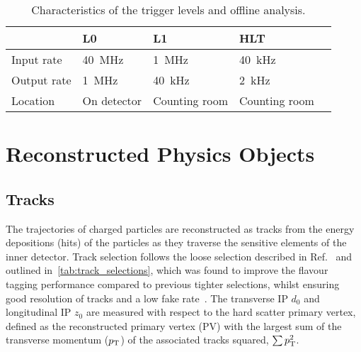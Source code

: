 \begin{table}[bht]
  \begin{tabular}{lllll}
                & L0              & L1              & HLT             \\
    \midrule
    Input rate  & \SI{40}{\MHz} & \SI{1}{\MHz}  & \SI{40}{\kHz} \\
    Output rate & \SI{1}{\MHz}  & \SI{40}{\kHz} & \SI{2}{\kHz}  \\
    Location    & On detector     & Counting room   & Counting room   \\
  \end{tabular}
  \caption{Characteristics of the trigger levels and offline analysis.}
  \label{tab:bg-theory:trigger_details}
\end{table}

\section{Reconstructed Physics Objects}\label{sec:physics-objects}

\subsection{Tracks}\label{sec:tracks}

The trajectories of charged particles are reconstructed as tracks from the energy depositions (hits) of the particles as they traverse the sensitive elements of the inner detector.
Track selection follows the loose selection described in Ref.~\cite{ATL-PHYS-PUB-2020-014} and outlined in~\cref{tab:track_selections}, which was found to improve the flavour tagging performance compared to previous tighter selections, whilst ensuring good resolution of tracks and a low fake rate~\cite{PERF-2015-08}.
The transverse IP $d_0$ and longitudinal IP $z_0$ are measured with respect to the hard scatter primary vertex, defined as the reconstructed primary vertex (PV) with the largest sum of the transverse momentum ($p_{\text{T}}$) of the associated tracks squared, $\sum p_{\text{T}}^2$.

